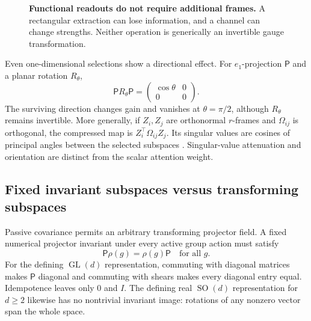 \documentclass[11pt,letterpaper]{article}
\newcommand{\GL}{\operatorname{GL}}
\newcommand{\SO}{\operatorname{SO}}
\theoremstyle{remark}
\begin{document}
\begin{figure}[tb]
\centering
{}
\caption{\textbf{Functional readouts do not require additional frames.} A rectangular extraction can lose information, and a channel can change strengths. Neither operation is generically an invertible gauge transformation.}
\end{figure}

Even one-dimensional selections show a directional effect. For $e_1$-projection $\mathsf P$ and a planar rotation $R_\theta$,
\begin{equation}
 \mathsf PR_\theta\mathsf P=
 \begin{pmatrix}\cos\theta&0\\0&0\end{pmatrix}.
\end{equation}
The surviving direction changes gain and vanishes at $\theta=\pi/2$, although $R_\theta$ remains invertible. More generally, if $Z_i,Z_j$ are orthonormal $r$-frames and $\Omega_{ij}$ is orthogonal, the compressed map is $Z_i^\top\Omega_{ij}Z_j$. Its singular values are cosines of principal angles between the selected subspaces \cite{Edelman1998}. Singular-value attenuation and orientation are distinct from the scalar attention weight.

\subsection{Fixed invariant subspaces versus transforming subspaces}
Passive covariance permits an arbitrary transforming projector field. A fixed numerical projector invariant under every active group action must satisfy
\begin{equation}
 \mathsf P\rho(g)=\rho(g)\mathsf P\quad\text{for all }g.
\end{equation}
For the defining $\GL(d)$ representation, commuting with diagonal matrices makes $\mathsf P$ diagonal and commuting with shears makes every diagonal entry equal. Idempotence leaves only $0$ and $I$. The defining real $\SO(d)$ representation for $d\ge2$ likewise has no nontrivial invariant image: rotations of any nonzero vector span the whole space.
\end{document}
